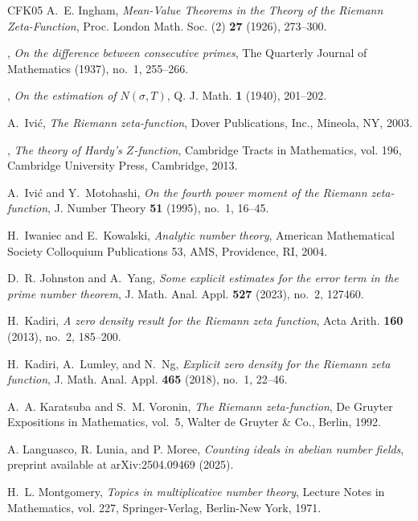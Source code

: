 \documentclass[a4paper,reqno]{amsart}
\theoremstyle{definition}
\begin{document}
\begin{thebibliography}{CFK{\etalchar{+}}05}
A.~E. Ingham, \emph{Mean-{V}alue {T}heorems in the {T}heory of the {R}iemann {Z}eta-{F}unction}, Proc. London Math. Soc. (2) \textbf{27} (1926), 273--300.

\bysame, \emph{On the difference between consecutive primes}, The Quarterly Journal of Mathematics (1937), no.~1, 255--266.

\bysame, \emph{On the estimation of ${N(\sigma, T)}$}, Q. J. Math. \textbf{1} (1940), 201--202.

A.~Ivi\'{c}, \emph{The {R}iemann zeta-function}, Dover Publications, Inc., Mineola, NY, 2003.

\bysame, \emph{The theory of {H}ardy's {$Z$}-function}, Cambridge Tracts in Mathematics, vol. 196, Cambridge University Press, Cambridge, 2013.

A.~Ivi\'c and Y.~Motohashi, \emph{On the fourth power moment of the {R}iemann zeta-function}, J. Number Theory \textbf{51} (1995), no.~1, 16--45.

H.~Iwaniec and E.~Kowalski, \emph{Analytic number theory}, American Mathematical Society Colloquium Publications 53, AMS, Providence, RI, 2004.

D.~R. Johnston and A.~Yang, \emph{Some explicit estimates for the error term in the prime number theorem}, J. Math. Anal. Appl. \textbf{527} (2023), no.~2, 127460.

H.~Kadiri, \emph{A zero density result for the {R}iemann zeta function}, Acta Arith. \textbf{160} (2013), no.~2, 185--200.

H.~Kadiri, A.~Lumley, and N.~Ng, \emph{Explicit zero density for the {R}iemann zeta function}, J. Math. Anal. Appl. \textbf{465} (2018), no.~1, 22--46.

A.~A. Karatsuba and S.~M. Voronin, \emph{The {R}iemann zeta-function}, De Gruyter Expositions in Mathematics, vol.~5, Walter de Gruyter \& Co., Berlin, 1992.

A. Languasco, R. Lunia, and P. Moree, \emph{Counting ideals in abelian number fields}, preprint available at arXiv:2504.09469 (2025).

H.~L. Montgomery, \emph{Topics in multiplicative number theory}, Lecture Notes in Mathematics, vol. 227, Springer-Verlag, Berlin-New York, 1971.


\end{thebibliography}
\end{document}
